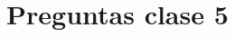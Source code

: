 \documentclass[../main_ej.tex]{subfiles}
\begin{document}
\section{Preguntas clase 5}
\end{document}
